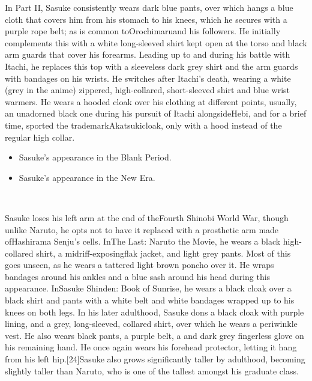 \documentclass[a4paper,12pt]{article}
\begin{document}
In Part II, Sasuke consistently wears dark blue pants, over which hangs a blue cloth that covers him from his stomach to his knees, which he secures with a purple rope belt; as is common toOrochimaruand his followers. He initially complements this with a white long-sleeved shirt kept open at the torso and black arm guards that cover his forearms. Leading up to and during his battle with Itachi, he replaces this top with a sleeveless dark grey shirt and the arm guards with bandages on his wrists. He switches after Itachi's death, wearing a white (grey in the anime) zippered, high-collared, short-sleeved shirt and blue wrist warmers. He wears a hooded cloak over his clothing at different points, usually, an unadorned black one during his pursuit of Itachi alongsideHebi, and for a brief time, sported the trademarkAkatsukicloak, only with a hood instead of the regular high collar.\\ \par \vspace{0.5cm}

\begin{itemize}
\item Sasuke's appearance in the Blank Period.
\item Sasuke's appearance in the New Era.
\end{itemize}\\ \par \vspace{0.5cm}

Sasuke loses his left arm at the end of theFourth Shinobi World War, though unlike Naruto, he opts not to have it replaced with a prosthetic arm made ofHashirama Senju's cells. InThe Last: Naruto the Movie, he wears a black high-collared shirt, a midriff-exposingflak jacket, and light grey pants. Most of this goes unseen, as he wears a tattered light brown poncho over it. He wraps bandages around his ankles and a blue sash around his head during this appearance. InSasuke Shinden: Book of Sunrise, he wears a black cloak over a black shirt and pants with a white belt and white bandages wrapped up to his knees on both legs. In his later adulthood, Sasuke dons a black cloak with purple lining, and a grey, long-sleeved, collared shirt, over which he wears a periwinkle vest. He also wears black pants, a purple belt, a and dark grey fingerless glove on his remaining hand. He once again wears his forehead protector, letting it hang from his left hip.[24]Sasuke also grows significantly taller by adulthood, becoming slightly taller than Naruto, who is one of the tallest amongst his graduate class.\\ \par \vspace{0.5cm}
\end{document}
